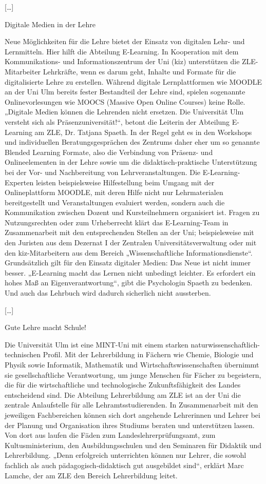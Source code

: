 [\ldots]

Digitale Medien in der Lehre

Neue Möglichkeiten für die Lehre bietet der Einsatz von digitalen Lehr- und Lernmitteln. Hier hilft die Abteilung E-Learning. In Kooperation mit dem  Kommunikations- und Informationszentrum der Uni (kiz) unterstützen die ZLE-Mitarbeiter Lehrkräfte, wenn es darum geht, Inhalte und Formate für die digitalisierte Lehre zu erstellen. Während digitale Lernplattformen wie MOODLE an der Uni Ulm bereits fester Bestandteil der Lehre sind, spielen sogenannte Onlinevorlesungen wie MOOCS (Massive Open Online Courses) keine Rolle. „Digitale Medien können die Lehrenden nicht ersetzen. Die Universität Ulm versteht sich als Präsenzuniversität!“, betont die Leiterin der Abteilung E-Learning am ZLE, Dr. Tatjana Spaeth. In der Regel geht es in den Workshops und individuellen Beratungsgesprächen des Zentrums daher eher um so genannte Blended Learning Formate, also die Verbindung von Präsenz- und Onlineelementen in der Lehre sowie um die didaktisch-praktische Unterstützung bei der Vor- und Nachbereitung von Lehrveranstaltungen. Die E-Learning-Experten leisten beispielsweise Hilfestellung beim Umgang mit der Onlineplattform MOODLE, mit deren Hilfe nicht nur Lehrmaterialen bereitgestellt und Veranstaltungen evaluiert werden, sondern auch die Kommunikation zwischen Dozent und Kursteilnehmern organisiert ist. Fragen zu Nutzungsrechten oder zum Urheberrecht klärt das E-Learning-Team in Zusammenarbeit mit den entsprechenden Stellen an der Uni; beispielsweise mit den Juristen aus dem Dezernat I der Zentralen Universitätsverwaltung oder mit den kiz-Mitarbeitern aus dem Bereich „Wissenschaftliche Informationsdienste“. Grundsätzlich gilt für den Einsatz digitaler Medien: Das Neue ist nicht immer besser. „E-Learning macht das Lernen nicht unbedingt leichter. Es erfordert ein hohes Maß an Eigenverantwortung“, gibt die Psychologin Spaeth zu bedenken. Und auch das Lehrbuch wird dadurch sicherlich nicht aussterben. 

[\ldots]

Gute Lehre macht Schule! 

Die Universität Ulm ist eine MINT-Uni mit einem starken naturwissenschaftlich-technischen Profil. Mit der Lehrerbildung in Fächern wie Chemie, Biologie und Physik sowie Informatik, Mathematik und Wirtschaftswissenschaften übernimmt sie gesellschaftliche Verantwortung, um junge Menschen für Fächer zu begeistern, die für die wirtschaftliche und technologische Zukunftsfähigkeit des Landes entscheidend sind. Die Abteilung Lehrerbildung am ZLE ist an der Uni die zentrale Anlaufstelle für alle Lehramtsstudierenden. In Zusammenarbeit mit den jeweiligen Fachbereichen können sich dort angehende Lehrerinnen und Lehrer bei der Planung und Organisation ihres Studiums beraten und unterstützen lassen. Von dort aus laufen die Fäden zum Landeslehrerprüfungsamt, zum Kultusministerium, den Ausbildungsschulen und den Seminaren für Didaktik und Lehrerbildung. „Denn erfolgreich unterrichten können nur Lehrer, die sowohl fachlich als auch pädagogisch-didaktisch gut ausgebildet sind“, erklärt Marc Lamche, der am ZLE den Bereich Lehrerbildung leitet. 


